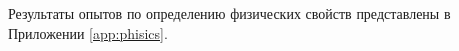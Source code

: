 Результаты опытов по определению физических свойств представлены в 
Приложении \ref{app:phisics}. 

